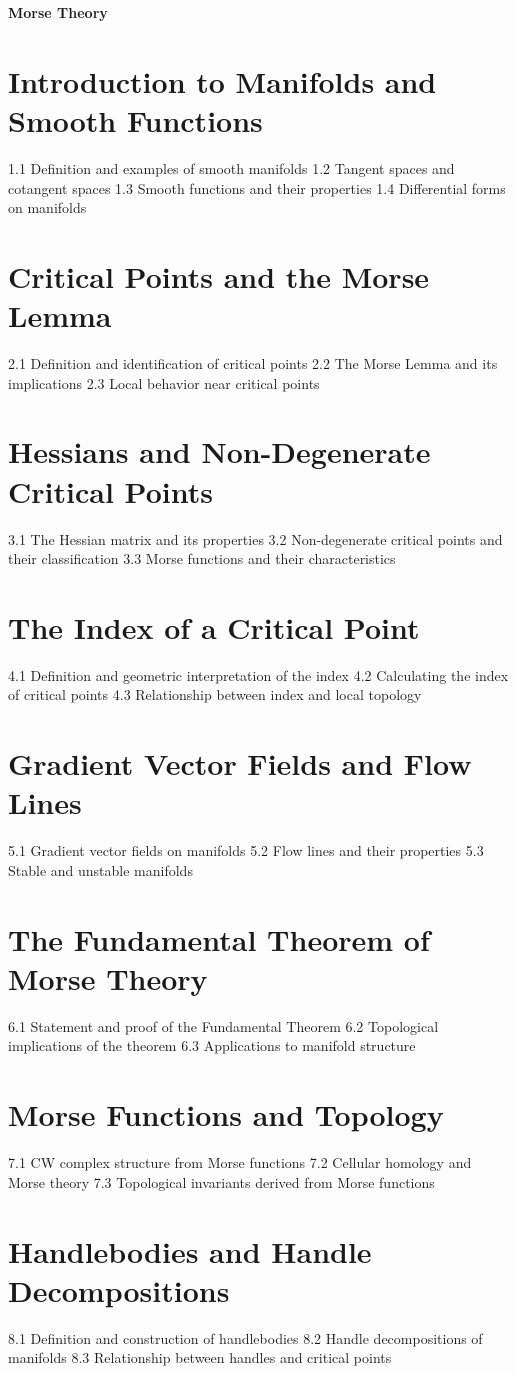 {\LARGE \bf{Morse Theory}}
\section{Introduction to Manifolds and Smooth Functions}
1.1 Definition and examples of smooth manifolds
1.2 Tangent spaces and cotangent spaces
1.3 Smooth functions and their properties
1.4 Differential forms on manifolds
\section{Critical Points and the Morse Lemma}
2.1 Definition and identification of critical points
2.2 The Morse Lemma and its implications
2.3 Local behavior near critical points
\section{Hessians and Non-Degenerate Critical Points}
3.1 The Hessian matrix and its properties
3.2 Non-degenerate critical points and their classification
3.3 Morse functions and their characteristics
\section{The Index of a Critical Point}
4.1 Definition and geometric interpretation of the index
4.2 Calculating the index of critical points
4.3 Relationship between index and local topology
\section{Gradient Vector Fields and Flow Lines}
5.1 Gradient vector fields on manifolds
5.2 Flow lines and their properties
5.3 Stable and unstable manifolds
\section{The Fundamental Theorem of Morse Theory}
6.1 Statement and proof of the Fundamental Theorem
6.2 Topological implications of the theorem
6.3 Applications to manifold structure
\section{Morse Functions and Topology}
7.1 CW complex structure from Morse functions
7.2 Cellular homology and Morse theory
7.3 Topological invariants derived from Morse functions
\section{Handlebodies and Handle Decompositions}
8.1 Definition and construction of handlebodies
8.2 Handle decompositions of manifolds
8.3 Relationship between handles and critical points
